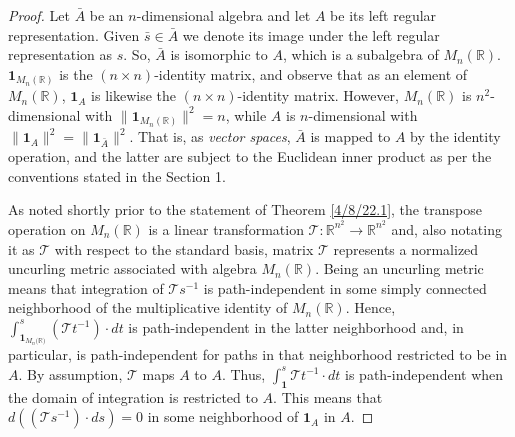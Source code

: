 \documentclass{amsart}
\numberwithin{equation}{section}
\theoremstyle{definition}
\numberwithin{theorem}{section}
\begin{document}
\begin{proof} 
Let $\bar{A}$ be an $n$-dimensional algebra and let $A$ be its left regular representation.  Given $\bar{s}\in\bar{A}$ we denote its image under the left regular representation as $s$.
 So, $\bar{A}$ is isomorphic to $A$, which is a subalgebra of $ M_n(\mathbb{R})$.   $\mathbf{1}_{M_n(\mathbb{R})}$ is the $(n\times n)$-identity matrix, and observe that as an element of $ M_n(\mathbb{R})$, $\mathbf{1}_A$ is likewise the $(n\times n)$-identity matrix.  However, $ M_n(\mathbb{R})$ is $n^2$-dimensional with $\|\mathbf{1}_{M_n(\mathbb{R})}\|^2 = n$, while $A$ is $n$-dimensional with $\|\mathbf{1}_A\|^2 = \|\mathbf{1}_{\bar{A}}\|^2$.  That is, as {\it vector spaces}, $\bar{A}$ is mapped to  $A$ by the identity operation, and the latter are subject to the Euclidean inner product as per the conventions stated in the Section 1.   

As noted shortly prior to the statement of Theorem \ref{4/8/22.1}, the transpose operation on $ M_n(\mathbb{R})$ is a linear transformation $\mathcal{\mathcal{T}}:\mathbb{R}^{n^2}\rightarrow \mathbb{R}^{n^2}$ and, also notating it as $\mathcal{\mathcal{T}}$ with respect to the standard basis, matrix $\mathcal{\mathcal{T}}$ represents a normalized uncurling metric associated with algebra  $ M_n(\mathbb{R})$.  Being an uncurling metric means that integration of $\mathcal{\mathcal{T}}s^{-1}$ is path-independent in some simply connected neighborhood of the multiplicative identity of $ M_n(\mathbb{R})$.  
 Hence, $\int_{\mathbf{1}_{M_n({\mathbb{R})}}}^s (\mathcal{\mathcal{T}}t^{-1})\cdot dt$ is path-independent in the latter neighborhood and, in particular, is path-independent for paths in that neighborhood restricted to be in $A$.  By assumption, $\mathcal{\mathcal{T}}$ maps $A$ to $A$. 
 Thus, $\int_\mathbf{1}^s \mathcal{\mathcal{T}}t^{-1}\cdot dt$ is path-independent when the domain of integration is restricted to $A$.  This means that 
  $d((\mathcal{\mathcal{T}}s^{-1})\cdot ds) = 0$ in some neighborhood of $\mathbf{1}_A$ in $A$.
  

\end{proof}
\end{document}
